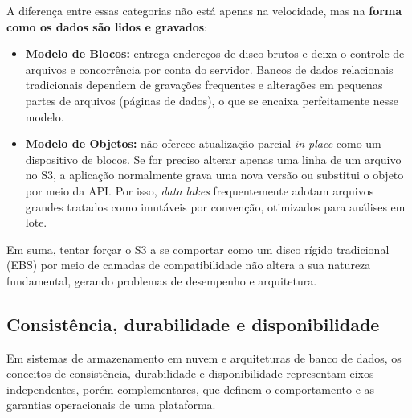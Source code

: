 \documentclass[11pt,a4paper]{article}
\begin{document}
A diferença entre essas categorias não está apenas na velocidade, mas na \textbf{forma como os dados são lidos e gravados}:

\begin{itemize}[leftmargin=*]
    \item \textbf{Modelo de Blocos:} entrega endereços de disco brutos e deixa o controle de arquivos e concorrência por conta do servidor. Bancos de dados relacionais tradicionais dependem de gravações frequentes e alterações em pequenas partes de arquivos (páginas de dados), o que se encaixa perfeitamente nesse modelo.
    \item \textbf{Modelo de Objetos:} não oferece atualização parcial \emph{in-place} como um dispositivo de blocos. Se for preciso alterar apenas uma linha de um arquivo no S3, a aplicação normalmente grava uma nova versão ou substitui o objeto por meio da API. Por isso, \emph{data lakes} frequentemente adotam arquivos grandes tratados como imutáveis por convenção, otimizados para análises em lote.
\end{itemize}

Em suma, tentar forçar o S3 a se comportar como um disco rígido tradicional (EBS) por meio de camadas de compatibilidade não altera a sua natureza fundamental, gerando problemas de desempenho e arquitetura.
\subsection{Consistência, durabilidade e disponibilidade}

Em sistemas de armazenamento em nuvem e arquiteturas de banco de dados, os conceitos de consistência, durabilidade e disponibilidade representam eixos independentes, porém complementares, que definem o comportamento e as garantias operacionais de uma plataforma.
\end{document}
